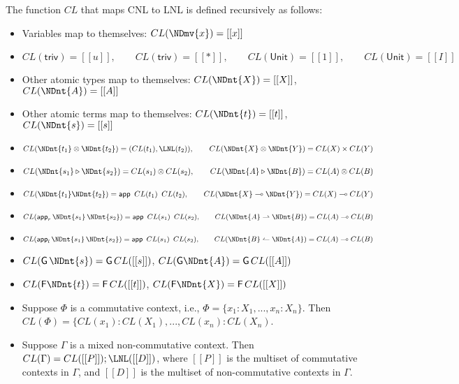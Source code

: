 \begin{definition}
  The function $CL$ that maps CNL to LNL is defined recursively as follows:
  \begin{itemize}
  \item Variables map to themselves: $CL(\NDmv{x}) = [[x]]$
  \item $CL( \mathsf{triv} ) = [[u]], \qquad CL( \mathsf{triv} ) = [[*]], \qquad CL( \mathsf{Unit} ) = [[1]], \qquad CL( \mathsf{Unit} ) = [[I]]$
  \item Other atomic types map to themselves: $CL(\NDnt{X}) = [[X]]$,
        $CL(\NDnt{A}) = [[A]]$
  \item Other atomic terms map to themselves: $CL(\NDnt{t}) = [[t]]$,
        $CL(\NDnt{s}) = [[s]]$
  \item $CL(\NDnt{t_{{\mathrm{1}}}}  \otimes  \NDnt{t_{{\mathrm{2}}}}) = (CL(t_1),\LNL(t_2)), \qquad CL(\NDnt{X}  \otimes  \NDnt{Y})=CL(X)\times CL(Y) $
  \item $CL(\NDnt{s_{{\mathrm{1}}}}  \triangleright  \NDnt{s_{{\mathrm{2}}}}) = CL(s_1)\otimes CL(s_2), \qquad CL(\NDnt{A}  \triangleright  \NDnt{B})=CL(A)\otimes CL(B)$
  \item $CL( \NDnt{t_{{\mathrm{1}}}}   \NDnt{t_{{\mathrm{2}}}} ) = \mathsf{app}\,\,\,CL(t_1)\,\,\,CL(t_2), \qquad CL(\NDnt{X}  \multimap  \NDnt{Y}) = CL(X) \multimap CL(Y)$
  \item $CL( \mathsf{app}_r\, \NDnt{s_{{\mathrm{1}}}} \, \NDnt{s_{{\mathrm{2}}}} ) = \mathsf{app}\,\,\,CL(s_1)\,\,\,CL(s_2), \qquad CL(\NDnt{A}  \rightharpoonup  \NDnt{B}) = CL(A) \multimap CL(B)$
  \item $CL( \mathsf{app}_l\, \NDnt{s_{{\mathrm{1}}}} \, \NDnt{s_{{\mathrm{2}}}} ) = \mathsf{app}\,\,\,CL(s_1)\,\,\,CL(s_2), \qquad CL(\NDnt{B}  \leftharpoonup  \NDnt{A}) = CL(A) \multimap CL(B)$
  \item $CL( \mathsf{G}\, \NDnt{s} ) = \mathsf{G}\,CL([[s]])$, \qquad $CL( \mathsf{G} \NDnt{A} ) = \mathsf{G}\,CL([[A]])$
  \item $CL( \mathsf{F} \NDnt{t} ) = \mathsf{F}\,CL([[t]])$, \qquad $CL( \mathsf{F} \NDnt{X} ) = \mathsf{F}\,CL([[X]])$
  \item Suppose $\Phi$ is a commutative context, i.e.,
        $\Phi=\{x_1:X_1,...,x_n:X_n\}$. Then \\
        $CL(\Phi)=\{CL(x_1):CL(X_1),...,CL(x_n):CL(X_n)$.
  \item Suppose $\Gamma$ is a mixed non-commutative context. Then
        $CL(\Gamma)=CL([[P]]);\LNL([[D]])$, where $[[P]]$ is the multiset of
        commutative contexts in $\Gamma$, and $[[D]]$ is the multiset of
        non-commutative contexts in $\Gamma$.
  \end{itemize}
\end{definition}

